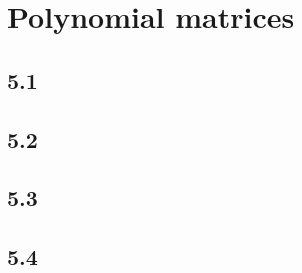 \section{Polynomial matrices}
\subsection*{5.1}
\nosolution

\subsection*{5.2}
\nosolution

\subsection*{5.3}
\nosolution

\subsection*{5.4}
\nosolution
